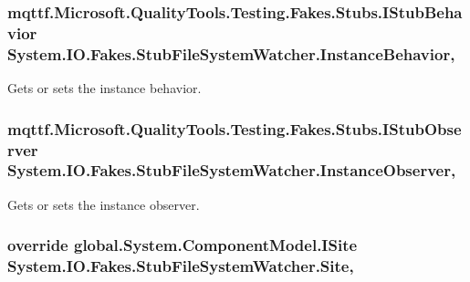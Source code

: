 \hypertarget{class_system_1_1_i_o_1_1_fakes_1_1_stub_file_system_watcher_adfb177b1f59a750f5aa5ecec7ae9309b}{
\subsubsection[{Instance\-Behavior}]{\setlength{\rightskip}{0pt plus 5cm}mqttf.\-Microsoft.\-Quality\-Tools.\-Testing.\-Fakes.\-Stubs.\-I\-Stub\-Behavior System.\-I\-O.\-Fakes.\-Stub\-File\-System\-Watcher.\-Instance\-Behavior\hspace{0.3cm}{\ttfamily [get]}, {\ttfamily [set]}}}\label{class_system_1_1_i_o_1_1_fakes_1_1_stub_file_system_watcher_adfb177b1f59a750f5aa5ecec7ae9309b}


Gets or sets the instance behavior.

\hypertarget{class_system_1_1_i_o_1_1_fakes_1_1_stub_file_system_watcher_ac28ceae553b1915f9237825081847020}{
\subsubsection[{Instance\-Observer}]{\setlength{\rightskip}{0pt plus 5cm}mqttf.\-Microsoft.\-Quality\-Tools.\-Testing.\-Fakes.\-Stubs.\-I\-Stub\-Observer System.\-I\-O.\-Fakes.\-Stub\-File\-System\-Watcher.\-Instance\-Observer\hspace{0.3cm}{\ttfamily [get]}, {\ttfamily [set]}}}\label{class_system_1_1_i_o_1_1_fakes_1_1_stub_file_system_watcher_ac28ceae553b1915f9237825081847020}


Gets or sets the instance observer.

\hypertarget{class_system_1_1_i_o_1_1_fakes_1_1_stub_file_system_watcher_ac104c4ba44f9b7f4b4760553d30417cf}{
\subsubsection[{Site}]{\setlength{\rightskip}{0pt plus 5cm}override global.\-System.\-Component\-Model.\-I\-Site System.\-I\-O.\-Fakes.\-Stub\-File\-System\-Watcher.\-Site\hspace{0.3cm}{\ttfamily [get]}, {\ttfamily [set]}}}\label{class_system_1_1_i_o_1_1_fakes_1_1_stub_file_system_watcher_ac104c4ba44f9b7f4b4760553d30417cf}


